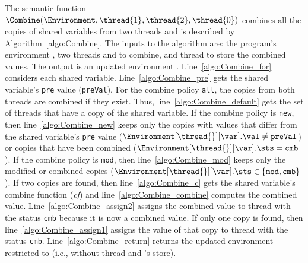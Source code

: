 \subsubsection{}
\label{sec:forec_Combine}
The semantic function $\Combine(\Environment, \thread{1}, \thread{2}, \thread{0})$ 
combines all the copies of shared variables from two threads
and is described by Algorithm~\ref{algo:Combine}.
The inputs to the algorithm are: the program's environment
\Environment{}, two threads  and  to
combine, and thread  to store the combined values.
The output is an updated environment \Environment{}. 
Line~\ref{algo:Combine_for} considers each shared variable\footnotemark[1]
\var{}.
Line~\ref{algo:Combine_pre} gets the shared variable's
\verb$pre$ value (\verb$preVal$). For the combine policy \verb$all$, the
copies from both threads are combined if they exist. Thus,
line~\ref{algo:Combine_default} gets the set of threads
\Thread{} that have a copy of the shared variable. If the
combine policy is \verb$new$, then line~\ref{algo:Combine_new} 
keeps only the copies with values that differ from the shared 
variable's \verb$pre$ value
($\Environment[\thread{}][\var].\val \neq \texttt{preVal}$) 
or copies that have been combined
($\Environment[\thread{}][\var].\sts = \texttt{cmb}$). 
If the combine policy is \verb$mod$, then line~\ref{algo:Combine_mod} 
keeps only the modified or combined copies 
($\Environment[\thread{}][\var].\sts \in \{ \texttt{mod}, \texttt{cmb} \}$). 
If two copies are
found, then line~\ref{algo:Combine_c} gets the shared 
variable's combine function (\emph{cf}) and line~\ref{algo:Combine_combine}
computes the combined value. Line~\ref{algo:Combine_assign2} 
assigns the combined value to thread  with the
status \verb$cmb$ because it is now a combined value. 
If only one copy is found, then line~\ref{algo:Combine_assign1} 
assigns the value of that copy to thread  with the
status \verb$cmb$. Line~\ref{algo:Combine_return} returns the 
updated environment \Environment{} restricted to 
(i.e., without thread  
and 's store).

